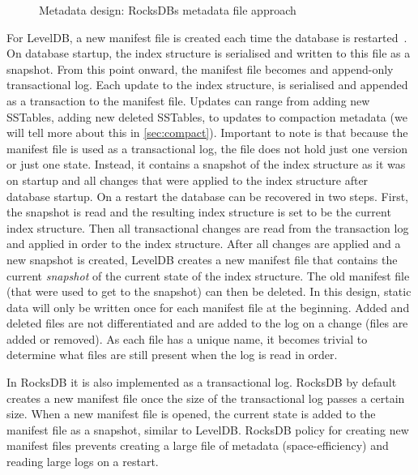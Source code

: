 \begin{figure}[h]
\centering
\begin{minipage}{0.35\textwidth}
  \centering
  
\end{minipage}%
\caption{ Metadata design: RocksDBs metadata file approach }
\label{fig:manifestfile}
\end{figure}

For LevelDB, a new manifest file is created each time the database is restarted~\cite{LevelDB}. On database startup, the index structure is serialised and written to this file as a snapshot. From this point onward, the manifest file becomes and append-only transactional log. Each update to the index structure, is serialised and appended as a transaction to the manifest file. Updates can range from adding new SSTables, adding new deleted SSTables, to updates to compaction metadata (we will tell more about this in \autoref{sec:compact}). Important to note is that because the manifest file is used as a transactional log, the file does not hold just one version or just one state. Instead, it contains a snapshot of the index structure as it was on startup and all changes that were applied to the index structure after database startup. On a restart the database can be recovered in two steps. First, the snapshot is read and the resulting index structure is set to be the current index structure. Then all transactional changes are read from the transaction log and applied in order to the index structure. After all changes are applied and a new snapshot is created, LevelDB creates a new manifest file that contains the current \textit{snapshot} of the current state of the index structure. The old manifest file (that were used to get to the snapshot) can then be deleted. In this design, static data will only be written once for each manifest file at the beginning. Added and deleted files are not differentiated and are added to the log on a change (files are added or removed). As each file has a unique name, it becomes trivial to determine what files are still present when the log is read in order.

In RocksDB it is also implemented as a transactional log. RocksDB by default creates a new manifest file once the size of the transactional log passes a certain size. When a new manifest file is opened, the current state is added to the manifest file as a snapshot, similar to LevelDB. RocksDB policy for creating new manifest files prevents creating a large file of metadata (space-efficiency) and reading large logs on a restart.


